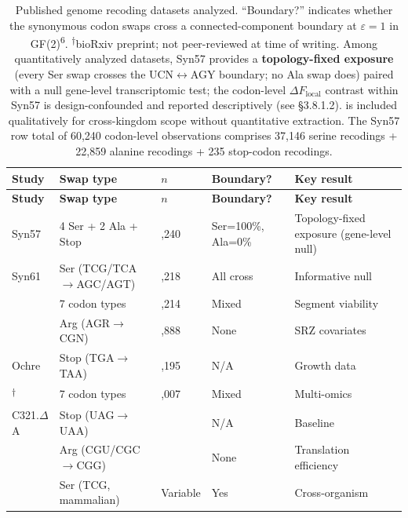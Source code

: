 \documentclass[preprint,11pt,authoryear,a4paper]{elsarticle}
\begin{document}
\begin{longtable}[]{@{}p{3.5cm}p{3.6cm}>{\raggedleft\arraybackslash}p{1.2cm}>{\centering\arraybackslash}p{2.5cm}p{3.5cm}@{}}
\caption{Published genome recoding datasets analyzed. ``Boundary?''
indicates whether the synonymous codon swaps cross a connected-component
boundary at \(\varepsilon = 1\) in GF(2)\textsuperscript{6}.
\textsuperscript{†}bioRxiv preprint; not peer-reviewed at time of
writing. Among quantitatively analyzed datasets, Syn57 provides a
\textbf{topology-fixed exposure} (every Ser swap crosses the
UCN\(\leftrightarrow\)AGY boundary; no Ala swap does) paired with a null
gene-level transcriptomic test; the codon-level
\(\Delta F_{\text{local}}\) contrast within Syn57 is design-confounded
and reported descriptively (see §3.8.1.2). \citep{ding2024} is included
qualitatively for cross-kingdom scope without quantitative extraction.
The Syn57 row total of 60,240 codon-level observations comprises 37,146
serine recodings + 22,859 alanine recodings + 235 stop-codon
recodings.}\tabularnewline
\toprule\noalign{}
\textbf{Study} & \textbf{Swap type} & \textbf{\(n\)} &
\textbf{Boundary?} & \textbf{Key result} \\
\midrule\noalign{}
\endfirsthead
\toprule\noalign{}
\textbf{Study} & \textbf{Swap type} & \textbf{\(n\)} &
\textbf{Boundary?} & \textbf{Key result} \\
\midrule\noalign{}
\endhead
\bottomrule\noalign{}
\endlastfoot
\citep{robertson2025syn57} Syn57 & 4 Ser + 2 Ala + Stop & 60,240 &
Ser=100\%, Ala=0\% & Topology-fixed exposure (gene-level null) \\
\citep{fredens2019} Syn61 & Ser (TCG/TCA\(\rightarrow\)AGC/AGT) & 18,218
& All cross & Informative null \\
\citep{ostrov2016} & 7 codon types & 62,214 & Mixed & Segment
viability \\
\citep{napolitano2016} & Arg (AGR\(\rightarrow\)CGN) & 12,888 & None &
SRZ covariates \\
\citep{grome2025ochre} Ochre & Stop (TGA\(\rightarrow\)TAA) & 1,195 &
N/A & Growth data \\
\citep{nyerges2024}\textsuperscript{†} & 7 codon types & 62,007 & Mixed
& Multi-omics \\
\citep{lajoie2013} C321.\(\Delta\)A & Stop (UAG\(\rightarrow\)UAA) & 321
& N/A & Baseline \\
\citep{frumkin2018} & Arg (CGU/CGC\(\rightarrow\)CGG) & 60 & None &
Translation efficiency \\
\citep{ding2024} & Ser (TCG, mammalian) & Variable & Yes &
Cross-organism \\
\end{longtable}
\end{document}
